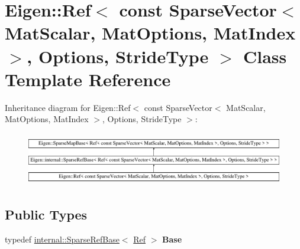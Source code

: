 \hypertarget{class_eigen_1_1_ref_3_01const_01_sparse_vector_3_01_mat_scalar_00_01_mat_options_00_01_mat_index673660e6a13ed7a7b712b0f75a25d720}{}\section{Eigen\+::Ref$<$ const Sparse\+Vector$<$ Mat\+Scalar, Mat\+Options, Mat\+Index $>$, Options, Stride\+Type $>$ Class Template Reference}
\label{class_eigen_1_1_ref_3_01const_01_sparse_vector_3_01_mat_scalar_00_01_mat_options_00_01_mat_index673660e6a13ed7a7b712b0f75a25d720}
Inheritance diagram for Eigen\+::Ref$<$ const Sparse\+Vector$<$ Mat\+Scalar, Mat\+Options, Mat\+Index $>$, Options, Stride\+Type $>$\+:\begin{figure}[H]
\begin{center}
\leavevmode
\includegraphics[height=2.366197cm]{class_eigen_1_1_ref_3_01const_01_sparse_vector_3_01_mat_scalar_00_01_mat_options_00_01_mat_index673660e6a13ed7a7b712b0f75a25d720}
\end{center}
\end{figure}
\subsection*{Public Types}
\begin{DoxyCompactItemize}
\item 
\mbox{\label{class_eigen_1_1_ref_3_01const_01_sparse_vector_3_01_mat_scalar_00_01_mat_options_00_01_mat_index673660e6a13ed7a7b712b0f75a25d720_a6e1728c5274bd6aaa6aaaed0ccd4b8d3}} 
typedef \mbox{\hyperlink{class_eigen_1_1internal_1_1_sparse_ref_base}{internal\+::\+Sparse\+Ref\+Base}}$<$ \mbox{\hyperlink{class_eigen_1_1_ref}{Ref}} $>$ {\bfseries Base}
\end{DoxyCompactItemize}
